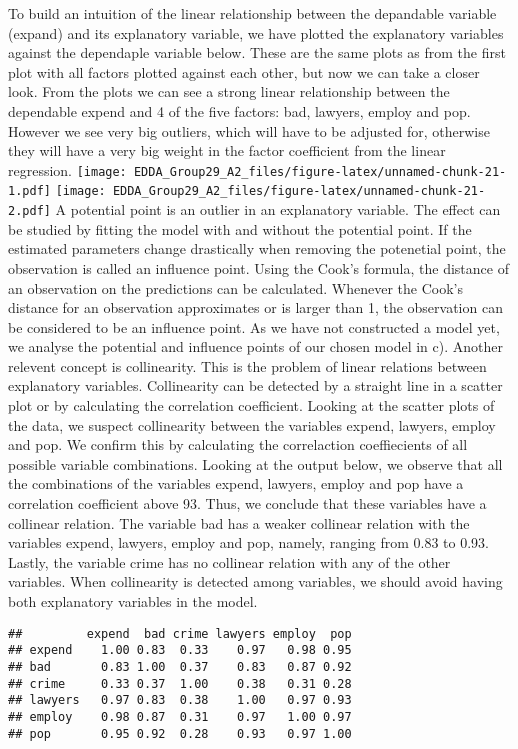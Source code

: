 \documentclass[]{article}
\begin{document}
To build an intuition of the linear relationship between the depandable
variable (expand) and its explanatory variable, we have plotted the
explanatory variables against the dependaple variable below. These are
the same plots as from the first plot with all factors plotted against
each other, but now we can take a closer look. From the plots we can see
a strong linear relationship between the dependable expend and 4 of the
five factors: bad, lawyers, employ and pop. However we see very big
outliers, which will have to be adjusted for, otherwise they will have a
very big weight in the factor coefficient from the linear regression.
\texttt{[image: EDDA\_Group29\_A2\_files/figure-latex/unnamed-chunk-21-1.pdf]}
\texttt{[image: EDDA\_Group29\_A2\_files/figure-latex/unnamed-chunk-21-2.pdf]}
A potential point is an outlier in an explanatory variable. The effect
can be studied by fitting the model with and without the potential
point. If the estimated parameters change drastically when removing the
potenetial point, the observation is called an influence point. Using
the Cook's formula, the distance of an observation on the predictions
can be calculated. Whenever the Cook's distance for an observation
approximates or is larger than 1, the observation can be considered to
be an influence point. As we have not constructed a model yet, we
analyse the potential and influence points of our chosen model in c).
Another relevent concept is collinearity. This is the problem of linear
relations between explanatory variables. Collinearity can be detected by
a straight line in a scatter plot or by calculating the correlation
coefficient. Looking at the scatter plots of the data, we suspect
collinearity between the variables expend, lawyers, employ and pop. We
confirm this by calculating the correlaction coeffiecients of all
possible variable combinations. Looking at the output below, we observe
that all the combinations of the variables expend, lawyers, employ and
pop have a correlation coefficient above 93. Thus, we conclude that
these variables have a collinear relation. The variable bad has a weaker
collinear relation with the variables expend, lawyers, employ and pop,
namely, ranging from 0.83 to 0.93. Lastly, the variable crime has no
collinear relation with any of the other variables. When collinearity is
detected among variables, we should avoid having both explanatory
variables in the model.

\begin{verbatim}
##         expend  bad crime lawyers employ  pop
## expend    1.00 0.83  0.33    0.97   0.98 0.95
## bad       0.83 1.00  0.37    0.83   0.87 0.92
## crime     0.33 0.37  1.00    0.38   0.31 0.28
## lawyers   0.97 0.83  0.38    1.00   0.97 0.93
## employ    0.98 0.87  0.31    0.97   1.00 0.97
## pop       0.95 0.92  0.28    0.93   0.97 1.00
\end{verbatim}
\end{document}
